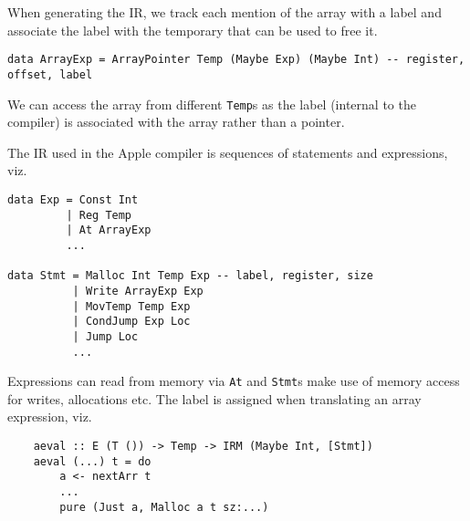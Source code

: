 \documentclass[sigplan,screen]{acmart}
\begin{document}
When generating the IR, we track each mention of the array with a label and associate the label with the temporary that can be used to free it.

\begin{verbatim}
data ArrayExp = ArrayPointer Temp (Maybe Exp) (Maybe Int) -- register, offset, label
\end{verbatim}

We can access the array from different {\tt Temp}s as the label (internal to the compiler) is associated with the array rather than a pointer.




The IR used in the Apple compiler is sequences of statements and expressions, viz.

\begin{verbatim}
data Exp = Const Int
         | Reg Temp
         | At ArrayExp
         ...

data Stmt = Malloc Int Temp Exp -- label, register, size
          | Write ArrayExp Exp
          | MovTemp Temp Exp
          | CondJump Exp Loc
          | Jump Loc
          ...
\end{verbatim}

Expressions can read from memory via {\tt At} and {\tt Stmt}s make use of memory access for writes, allocations etc. The label is assigned when translating an array expression, viz.


\begin{verbatim}
    aeval :: E (T ()) -> Temp -> IRM (Maybe Int, [Stmt])
    aeval (...) t = do
        a <- nextArr t
        ...
        pure (Just a, Malloc a t sz:...)
\end{verbatim}
\end{document}
